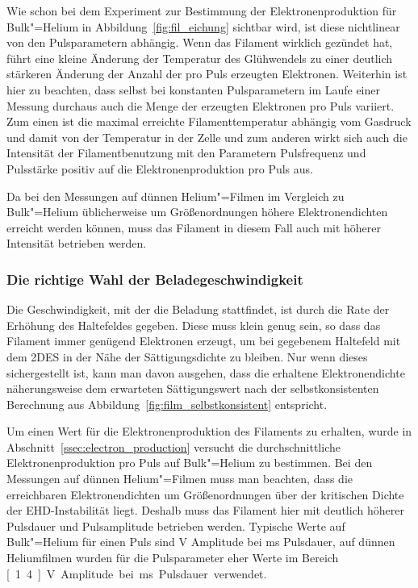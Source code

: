 Wie schon bei dem Experiment zur Bestimmung der Elektronenproduktion für Bulk"=Helium in Abbildung~\ref{fig:fil_eichung} sichtbar wird, ist diese nichtlinear von den Pulsparametern abhängig. Wenn das Filament wirklich gezündet hat, führt eine kleine Änderung der Temperatur des Glühwendels zu einer deutlich stärkeren Änderung der Anzahl der pro Puls erzeugten Elektronen. Weiterhin ist hier zu beachten, dass selbst bei konstanten Pulsparametern im Laufe einer Messung durchaus auch die Menge der erzeugten Elektronen pro Puls variiert. Zum einen ist die maximal erreichte Filamenttemperatur abhängig vom Gasdruck und damit von der Temperatur in der Zelle und zum anderen wirkt sich auch die Intensität der Filamentbenutzung mit den Parametern Pulsfrequenz und Pulsstärke positiv auf die Elektronenproduktion pro Puls aus. 

Da bei den Messungen auf dünnen Helium"=Filmen im Vergleich zu Bulk"=Helium üblicherweise um Größenordnungen höhere Elektronendichten erreicht werden können, muss das Filament in diesem Fall auch mit höherer Intensität betrieben werden.

\subsubsection{Die richtige Wahl der Beladegeschwindigkeit}
Die Geschwindigkeit, mit der die Beladung stattfindet, ist durch die Rate der Erhöhung des Haltefeldes gegeben. Diese muss klein genug sein, so dass das Filament immer genügend Elektronen erzeugt, um bei gegebenem Haltefeld mit dem 2DES in der Nähe der Sättigungsdichte zu bleiben. Nur wenn dieses sichergestellt ist, kann man davon ausgehen, dass die erhaltene Elektronendichte näherungsweise dem erwarteten Sättigungswert nach der selbstkonsistenten Berechnung aus Abbildung~\ref{fig:film_selbstkonsistent} entspricht.

Um einen Wert für die Elektronenproduktion des Filaments zu erhalten, wurde in Abschnitt~\ref{ssec:electron_production} versucht die durchschnittliche Elektronenproduktion pro Puls auf Bulk"=Helium zu bestimmen. Bei den Messungen auf dünnen Helium"=Filmen muss man beachten, dass die erreichbaren Elektronendichten um Größenordnungen über der kritischen Dichte der EHD-Instabilität liegt. Deshalb muss das Filament hier mit deutlich höherer Pulsdauer und Pulsamplitude betrieben werden. Typische Werte auf Bulk"=Helium für einen Puls sind \unit[1]{V} Amplitude bei \unit[40]{ms} Pulsdauer, auf dünnen Heliumfilmen wurden für die Pulsparameter eher Werte im Bereich \unit[1.4]{V} Amplitude bei \unit[100]{ms} Pulsdauer verwendet.

